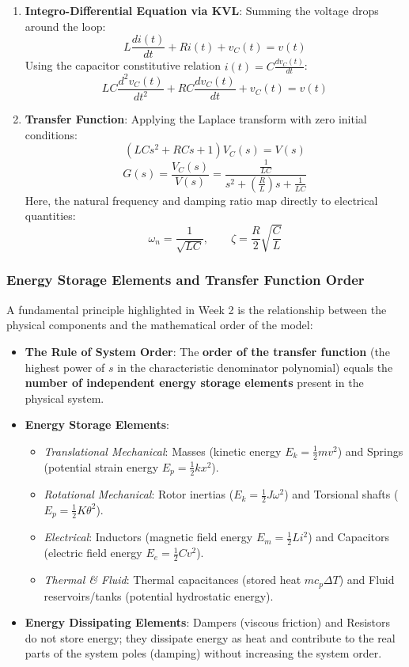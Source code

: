 \documentclass[12pt,onecolumn,twoside ]{article}
\begin{document}
	
	
	\begin{enumerate}
		\item
		\textbf{Integro-Differential Equation via KVL}: Summing the voltage drops around the loop: \[
		L \frac{di(t)}{dt} + R i(t) + v_C(t) = v(t)
		\] Using the capacitor constitutive relation $i(t) = C \frac{dv_C(t)}{dt}$: \[
		L C \frac{d^2 v_C(t)}{dt^2} + R C \frac{dv_C(t)}{dt} + v_C(t) = v(t)
		\]
		\item
		\textbf{Transfer Function}: Applying the Laplace transform with zero initial conditions: \[
		(L C s^2 + R C s + 1) V_C(s) = V(s)
		\] \[
		G(s) = \frac{V_C(s)}{V(s)} = \frac{\frac{1}{LC}}{s^2 + \left(\frac{R}{L}\right)s + \frac{1}{LC}}
		\] Here, the natural frequency and damping ratio map directly to electrical quantities: \[
		\omega_n = \frac{1}{\sqrt{LC}}, \qquad \zeta = \frac{R}{2}\sqrt{\frac{C}{L}}
		\]
	\end{enumerate}
	
	\subsubsection{Energy Storage Elements and Transfer Function Order}
	A fundamental principle highlighted in Week 2 is the relationship between the physical components and the mathematical order of the model:
	\begin{itemize}
		\item
		\textbf{The Rule of System Order}: The \textbf{order of the transfer function} (the highest power of $s$ in the characteristic denominator polynomial) equals the \textbf{number of independent energy storage elements} present in the physical system.
		\item
		\textbf{Energy Storage Elements}:
		\begin{itemize}
			\item
			\textit{Translational Mechanical}: Masses (kinetic energy $E_k = \frac{1}{2}m v^2$) and Springs (potential strain energy $E_p = \frac{1}{2}k x^2$).
			\item
			\textit{Rotational Mechanical}: Rotor inertias ($E_k = \frac{1}{2}J \omega^2$) and Torsional shafts ($E_p = \frac{1}{2}K \theta^2$).
			\item
			\textit{Electrical}: Inductors (magnetic field energy $E_m = \frac{1}{2}L i^2$) and Capacitors (electric field energy $E_e = \frac{1}{2}C v^2$).
			\item
			\textit{Thermal \& Fluid}: Thermal capacitances (stored heat $m c_p \Delta T$) and Fluid reservoirs/tanks (potential hydrostatic energy).
		\end{itemize}
		\item
		\textbf{Energy Dissipating Elements}: Dampers (viscous friction) and Resistors do not store energy; they dissipate energy as heat and contribute to the real parts of the system poles (damping) without increasing the system order.
	\end{itemize}
\end{document}
